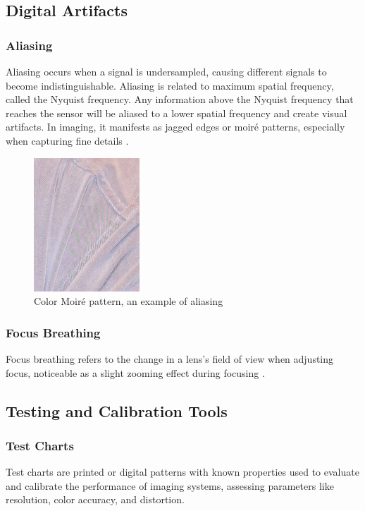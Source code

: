 \subsection{Digital Artifacts}

\subsubsection{Aliasing}
Aliasing occurs when a signal is undersampled, causing different signals to become indistinguishable. Aliasing is related to maximum spatial frequency, called the Nyquist frequency. Any information above the Nyquist frequency that reaches the sensor will be aliased to a lower spatial frequency and create visual artifacts. In imaging, it manifests as jagged edges or moiré patterns, especially when capturing fine details \cite{Aliasing}.

\begin{figure}[htbp]
\centering
\includegraphics[height=5cm]{Images/color_moire.jpg}
\caption{Color Moiré pattern, an example of aliasing \cite{Aliasing}}
\label{fig:moire}
\end{figure}

\subsubsection{Focus Breathing}
Focus breathing refers to the change in a lens's field of view when adjusting focus, noticeable as a slight zooming effect during focusing \cite{FocusBreathing}.

\subsection{Testing and Calibration Tools}

\subsubsection{Test Charts}
Test charts are printed or digital patterns with known properties used to evaluate and calibrate the performance of imaging systems, assessing parameters like resolution, color accuracy, and distortion.

